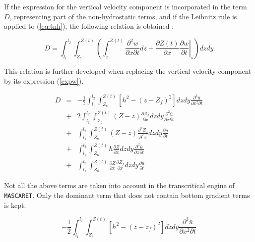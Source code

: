 \vspace{0.5cm}

If the expression for the vertical velocity component is incorporated in the term $D$, representing part of the non-hydrostatic terms, and if the Leibnitz rule is applied to (\ref{eq:tnh}), the following relation is obtained :

\begin{equation}
  D =\int_{l_{1}}^{l_{2}}\int_{Z_{b}}^{Z(t)}\left(\int_{z}^{Z(t)}\frac{\partial^2{w}}{\partial{x}\partial{t}}dz+\left.\frac{\partial{Z(t)}}{\partial{x}}\frac{\partial{w}}{\partial{t}}\right|_s\right)dzdy
\end{equation}
 
\vspace{0.5cm}

This relation is further developed when replacing the vertical velocity component by its expression (\ref{expw}).

\begin{eqnarray} 
  D & = & -\frac{1}{2}\int_{l_{1}}^{l_{2}}\int_{Z_{b}}^{Z(t)}\left[{h}^2-{(z-Z_f)}^2\right]dzdy\frac{\partial^3{\bar{u}}}{\partial{{x}^2}\partial{t}} \\
    & + & 2\int_{l_{1}}^{l_{2}}\int_{Z_{b}}^{Z(t)}(Z-z)\frac{\partial{Z_f}}{\partial{x}}dzdy\frac{\partial^2{\bar{u}}}{\partial{x}\partial{t}} \nonumber \\
    & + & \int_{l_{1}}^{l_{2}}\int_{Z_{b}}^{Z(t)}(Z-z)\frac{\partial^2{Z_f}}{\partial^2{x}}dzdy\frac{\partial{\bar{u}}}{\partial{t}}\nonumber \\ & + & \int_{l_{1}}^{l_{2}}\int_{Z_{b}}^{Z(t)}h\frac{\partial{Z}}{\partial{x}}dzdy\frac{\partial^2{\bar{u}}}{\partial{x}\partial{t}}\nonumber \\
& + & \int_{l_{1}}^{l_{2}}\int_{Z_{b}}^{Z(t)}\frac{\partial{Z}}{\partial{x}}\frac{\partial{Z_f}}{\partial{x}}dzdy\frac{\partial{\bar{u}}}{\partial{t}} \nonumber
\end{eqnarray}

\vspace{0.5cm}

Not all the above terms are taken into account in the transcritical engine of \texttt{MASCARET}. Only the dominant term that does not contain bottom gradient terms is kept:

\begin{equation}
-\frac{1}{2}\int_{l_{1}}^{l_{2}}\int_{Z_{b}}^{Z(t)}\left[{h}^2-{(z-z_f)}^2\right]dzdy\frac{\partial^3{\bar{u}}}{\partial{{x}^2}\partial{t}}
\end{equation}

